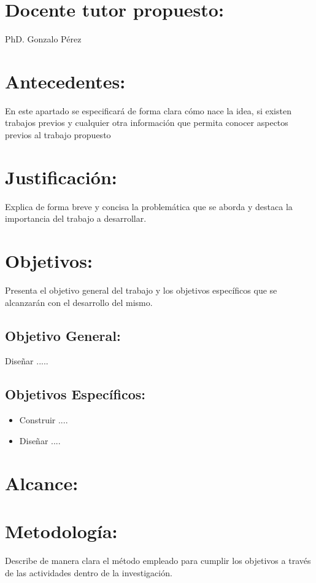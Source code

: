 \documentclass{article}
\begin{document}
\section{Docente tutor propuesto:   }
\begin{center}
PhD. Gonzalo Pérez
\end{center}
\section{Antecedentes:}
En este apartado se especificará de forma clara cómo nace la idea, si existen trabajos previos y cualquier otra información que permita conocer aspectos previos al trabajo propuesto  \cite{rodriguez2020arquitectura}  

 \lipsum[1-1]
       
\section{Justificación:}   
Explica de forma breve y concisa la problemática que se aborda y destaca la importancia del trabajo a desarrollar. 
\section{Objetivos:}
Presenta el objetivo general del trabajo y los objetivos específicos que se alcanzarán con el desarrollo del mismo. 
\subsection*{Objetivo General:}
Diseñar .....
\subsection*{Objetivos Específicos:}

\begin{itemize}
    \item Construir ....
    \item Diseñar ....
\end{itemize}

\section{Alcance:}
\section{Metodología:}

Describe de manera clara el método empleado para cumplir los objetivos a través de las actividades dentro de la investigación. 
\end{document}
